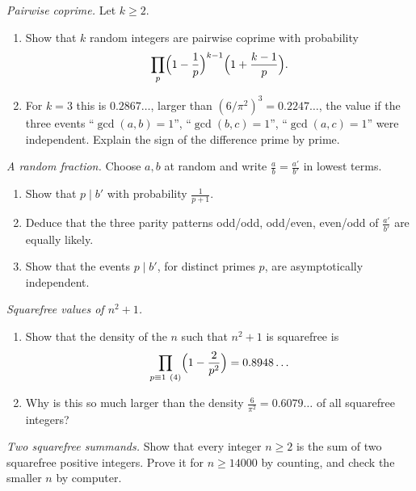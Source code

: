 \begin{exercise}[$\star\star$]\label{pb:pairwise}
\emph{Pairwise coprime.} Let $k\ge2$.
\begin{enumerate}[label=(\alph*)]
\item Show that $k$ random integers are pairwise coprime with probability
\[
\prod_p\Bigl(1-\frac1p\Bigr)^{k-1}\Bigl(1+\frac{k-1}p\Bigr).
\]
\item For $k=3$ this is $0.2867\ldots$, larger than $(6/\pi^2)^3=0.2247\ldots$, the value if the three events
``$\gcd(a,b)=1$'', ``$\gcd(b,c)=1$'', ``$\gcd(a,c)=1$'' were independent. Explain the sign of the difference prime by prime.
\end{enumerate}
\end{exercise}

\begin{exercise}[$\star$]\label{pb:parity}
\emph{A random fraction.} Choose $a,b$ at random and write $\frac ab=\frac{a'}{b'}$ in lowest terms.
\begin{enumerate}[label=(\alph*)]
\item Show that $p\mid b'$ with probability $\frac1{p+1}$.
\item Deduce that the three parity patterns odd/odd, odd/even, even/odd of $\frac{a'}{b'}$ are equally likely.
\item Show that the events $p\mid b'$, for distinct primes $p$, are asymptotically independent.
\end{enumerate}
\end{exercise}

\begin{exercise}[$\star\star$]\label{pb:nsq1sqfree}
\emph{Squarefree values of $n^2+1$.}
\begin{enumerate}[label=(\alph*)]
\item Show that the density of the $n$ such that $n^2+1$ is squarefree is
\[
\prod_{p\equiv1\ (4)}\Bigl(1-\frac2{p^2}\Bigr)=0.8948\ldots
\]
\item Why is this so much larger than the density $\frac6{\pi^2}=0.6079\ldots$ of all squarefree integers?
\end{enumerate}
\end{exercise}

\begin{exercise}[$\star\star\star$]\label{pb:twosqfree}
\emph{Two squarefree summands.} Show that every integer $n\ge2$ is the sum of two squarefree positive integers. Prove it for
$n\ge14000$ by counting, and check the smaller $n$ by computer.
\end{exercise}

